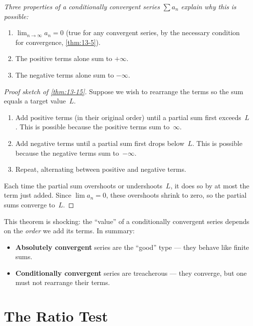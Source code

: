 \textit{Three properties of a conditionally convergent series $\sum a_{n}$ explain why this is possible:}
\begin{enumerate}[label=(\roman*)]
  \item $\lim_{n\to\infty}a_{n}=0$ (true for any convergent series, by the necessary condition for convergence, \cref{thm:13-5}).
  \item The positive terms alone sum to $+\infty$.
  \item The negative terms alone sum to $-\infty$.
\end{enumerate}

\begin{proof}[Proof sketch of \cref{thm:13-15}]
Suppose we wish to rearrange the terms so the sum equals a target value~$L$.
\begin{enumerate}
  \item Add positive terms (in their original order) until a partial sum first exceeds~$L$.  This is possible because the positive terms sum to~$\infty$.
  \item Add negative terms until a partial sum first drops below~$L$.  This is possible because the negative terms sum to~$-\infty$.
  \item Repeat, alternating between positive and negative terms.
\end{enumerate}
Each time the partial sum overshoots or undershoots~$L$, it does so by at most the term just added.  Since $\lim a_{n}=0$, these overshoots shrink to zero, so the partial sums converge to~$L$.
\end{proof}

\begin{remark}
This theorem is shocking: the ``value'' of a conditionally convergent series depends on the \emph{order} we add its terms.  In summary:
\begin{itemize}
  \item \textbf{Absolutely convergent} series are the ``good'' type --- they behave like finite sums.
  \item \textbf{Conditionally convergent} series are treacherous --- they converge, but one must not rearrange their terms.
\end{itemize}
\end{remark}

\section{The Ratio Test}
\label{sec:13.18}


